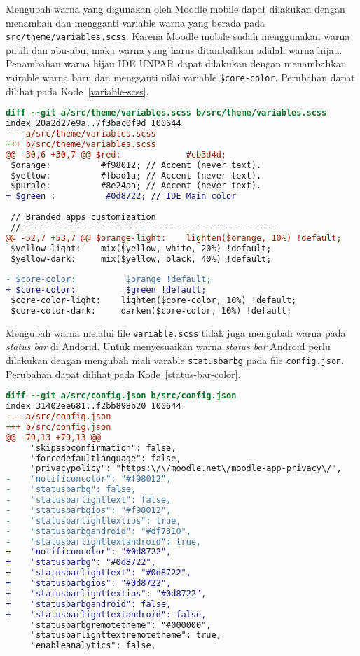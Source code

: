 Mengubah warna yang digunakan oleh Moodle mobile dapat dilakukan dengan menambah dan mengganti variable warna yang berada pada \texttt{src/theme/variables.scss}. Karena Moodle mobile sudah menggunakan warna putih dan abu-abu, maka warna yang harus ditambahkan adalah warna hijau. Penambahan warna hijau IDE UNPAR dapat dilakukan dengan menambahkan vairable warna baru dan mengganti nilai variable \texttt{\$core-color}. Perubahan dapat dilihat pada \mbox{Kode \ref{variable-scss}}.

\begin{lstlisting}[language = diff, frame=single, label ={variable-scss}, caption = Mengubah warna utama menjadi warna hijau ]
diff --git a/src/theme/variables.scss b/src/theme/variables.scss
index 20a2d27e9a..7f3bac0f9d 100644
--- a/src/theme/variables.scss
+++ b/src/theme/variables.scss
@@ -30,6 +30,7 @@ $red:             #cb3d4d;
 $orange:          #f98012; // Accent (never text).
 $yellow:          #fbad1a; // Accent (never text).
 $purple:          #8e24aa; // Accent (never text).
+ $green :          #0d8722; // IDE Main color
 
 // Branded apps customization
 // --------------------------------------------------
@@ -52,7 +53,7 @@ $orange-light:    lighten($orange, 10%) !default;
 $yellow-light:    mix($yellow, white, 20%) !default;
 $yellow-dark:     mix($yellow, black, 40%) !default;
 
- $core-color:          $orange !default;
+ $core-color:          $green !default;
 $core-color-light:    lighten($core-color, 10%) !default;
 $core-color-dark:     darken($core-color, 10%) !default;
\end{lstlisting}

Mengubah warna melalui file \texttt{variable.scss} tidak juga mengubah warna pada \textit{status bar} di Andorid. Untuk menyesuaikan warna \textit{status bar} Android perlu dilakukan dengan mengubah niali varable \texttt{statusbarbg} pada file \texttt{config.json}. Perubahan dapat dilihat pada \mbox{Kode \ref{status-bar-color}}. 

\begin{lstlisting}[language = diff, frame=single, label ={status-bar-color}, caption = Variable untuk mengubah warna dari \textit{status bar} pada config.json ]
diff --git a/src/config.json b/src/config.json
index 31402ee681..f2bb898b20 100644
--- a/src/config.json
+++ b/src/config.json
@@ -79,13 +79,13 @@
     "skipssoconfirmation": false,
     "forcedefaultlanguage": false,
     "privacypolicy": "https:\/\/moodle.net\/moodle-app-privacy\/",
-    "notificoncolor": "#f98012",
-    "statusbarbg": false,
-    "statusbarlighttext": false,
-    "statusbarbgios": "#f98012",
-    "statusbarlighttextios": true,
-    "statusbarbgandroid": "#df7310",
-    "statusbarlighttextandroid": true,
+    "notificoncolor": "#0d8722",
+    "statusbarbg": "#0d8722",
+    "statusbarlighttext": "#0d8722",
+    "statusbarbgios": "#0d8722",
+    "statusbarlighttextios": "#0d8722",
+    "statusbarbgandroid": false,
+    "statusbarlighttextandroid": false,
     "statusbarbgremotetheme": "#000000",
     "statusbarlighttextremotetheme": true,
     "enableanalytics": false,
\end{lstlisting}

